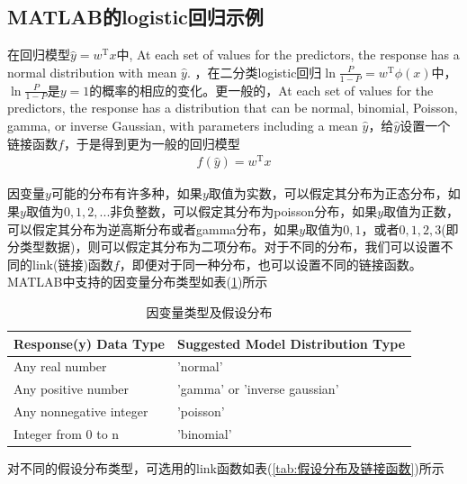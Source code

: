     \subsection{MATLAB的logistic回归示例}
        \par
        在回归模型$\hat{y} = w^\mathrm{T}x$中, At each set of values for the predictors, the response has a normal distribution with mean $\hat{y}$.
        ，在二分类logistic回归$\ln \frac{P}{1-P} = w^\mathrm{T}\phi(x)$中，$\ln \frac{P}{1-P}$是$y=1$的概率的相应的变化。更一般的，At each set of values for the predictors, the response has a distribution that can be normal, binomial, Poisson, gamma, or inverse Gaussian, with parameters including a mean $\hat{y}$，给$\hat{y}$设置一个链接函数$f$，于是得到更为一般的回归模型
        \begin{align*}
        f(\hat{y}) = w^\mathrm{T}x
        \end{align*}
        \par
        因变量$y$可能的分布有许多种，如果$y$取值为实数，可以假定其分布为正态分布，如果$y$取值为$0,1,2,...$非负整数，可以假定其分布为poisson分布，如果$y$取值为正数，可以假定其分布为逆高斯分布或者gamma分布，如果$y$取值为$0,1$，或者$0,1,2,3$(即分类型数据)，则可以假定其分布为二项分布。对于不同的分布，我们可以设置不同的link(链接)函数$f$，即便对于同一种分布，也可以设置不同的链接函数。MATLAB中支持的因变量分布类型如表(\ref{tab:因变量类型及分布})所示
        \begin{table}[H]\caption{因变量类型及假设分布}
        \label{tab:因变量类型及分布}
        \centering
        \begin{tabular}{l|l}
        \toprule
        Response(y) Data Type & Suggested Model Distribution Type \\
        \midrule
        Any real number &'normal'\\
        Any positive number &'gamma' or 'inverse gaussian'\\
        Any nonnegative integer& 'poisson'\\
        Integer from 0 to n& 'binomial'\\
        \bottomrule
        \end{tabular}
        \end{table}
        \par
        对不同的假设分布类型，可选用的link函数如表(\ref{tab:假设分布及链接函数})所示

